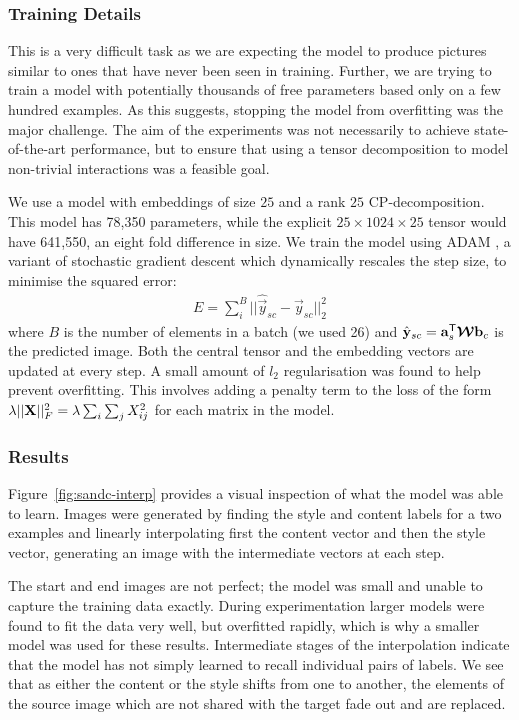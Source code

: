 \subsubsection{Training Details}
This is a very difficult task as we are expecting the model to produce pictures similar to ones
that have never been seen in training. Further, we are trying to train a model with potentially
thousands of free parameters based only on a few hundred examples. As this suggests, stopping
the model from overfitting was the major challenge. The aim of the experiments was not
necessarily to achieve state-of-the-art performance, but to ensure that using a tensor
decomposition to model non-trivial interactions was a feasible goal.

We use a model with
embeddings of size \(25\) and a rank \(25\) CP-decomposition. This model has 78,350
parameters, while the explicit \(25 \times 1024 \times 25\) tensor
would have 641,550, an eight fold difference in size. 
We train the model using ADAM \autocite{Kingma2014}, a variant of
stochastic gradient descent which dynamically rescales the step size, to minimise the squared error:
\begin{align}
	E = \sum_{i}^B ||\hat{\vec{y}}_{sc} - \vec{y}_{sc}||_2^2
\end{align} where \(B\) is the number of elements in a batch (we used 26) and
\(\hat{\mathbf{y}}_{sc} = \mathbf{a}_s^\mathsf{T}\bm{\mathcal{W}}\mathbf{b}_c\) is the predicted image. Both
the central tensor and the embedding vectors are updated at every step. A small amount
of \(l_2\) regularisation was found to help prevent overfitting. This involves adding a penalty
term to the loss of the form \(\lambda||\mathbf{X}||_F^2 = \lambda\sum_i\sum_jX_{ij}^2\) for
each matrix in the model.

\subsubsection{Results}
Figure~\ref{fig:sandc-interp} provides a visual inspection of what the model was able to
learn. Images were generated by finding the style and content labels for a two examples and
linearly interpolating first the content vector and then the style vector, generating an
image with the intermediate vectors at each step. 

The start and end images are not perfect; the model was small and unable to capture the training
data exactly. During experimentation larger models were found to fit the data very well, but 
overfitted rapidly, which is why a smaller model was used for these results.
Intermediate stages of the interpolation indicate that the model has
not simply learned to recall individual pairs of labels. We see that as either the content or
the style shifts from one to another, the elements of the source image which are not shared with
the target fade out and are replaced.


